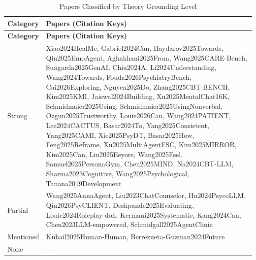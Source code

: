 \begin{longtable}{p{2.5cm}p{13cm}}
\caption{Papers Classified by Theory Grounding Level}
\label{tab:theory-grounding} \\
\toprule
\textbf{Category} & \textbf{Papers (Citation Keys)} \\
\midrule
\endfirsthead

\toprule
\textbf{Category} & \textbf{Papers (Citation Keys)} \\
\midrule
\endhead

\bottomrule
\endfoot
\hyphenpenalty=10000\exhyphenpenalty=10000\tolerance=10000\raggedright
Strong & Xiao2024HealMe, Gabriel2024Can, Haydarov2025Towards, Qiu2025EmoAgent, Aghakhani2025From, Wang2025CARE-Bench, Sungarda2025GenAI, Chiu2024A, Li2024Understanding, Wang2024Towards, Fouda2026PsychiatryBench, Cai2026Exploring, Nguyen2025Do, Zhang2025CBT-BENCH, Kim2025KMI, Jaiswal2024Building, Xu2025MentalChat16K, Schmidmaier2025Using, Schmidmaier2025UsingNonverbal, Ozgun2025Trustworthy, Louie2026Can, Wang2024PATIENT, Lee2024CACTUS, Basar2024To, Yang2025Consistent, Yang2025CAMI, Xie2025PsyDT, Basar2025How, Feng2025Reframe, Xu2025MultiAgentESC, Kim2025MIRROR, Kim2025Can, Liu2025Eeyore, Wang2025Feel, Samuel2025PersonaGym, Chen2025MIND, Na2024CBT-LLM, Sharma2023Cognitive, Wang2025Psychological, Tanana2019Development \\
Partial & Wang2025AnnaAgent, Liu2023ChatCounselor, Hu2024PsycoLLM, Qiu2026PsyCLIENT, Deshpande2025Evaluating, Louie2024Roleplay-doh, Kermani2025Systematic, Kang2024Can, Chen2023LLM-empowered, Schmidgall2025AgentClinic \\
Mentioned & Kuhail2025Human-Human, Berrezueta-Guzman2024Future \\
None & --- \\
\end{longtable}
